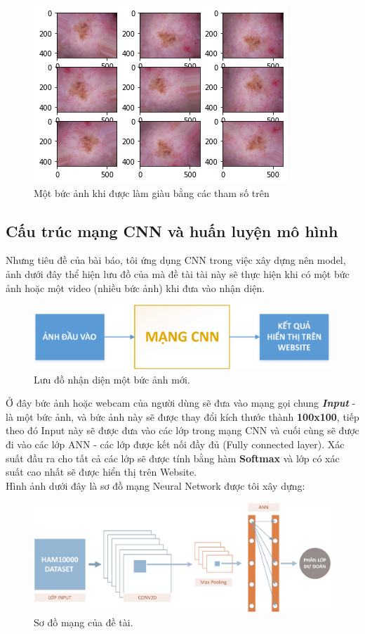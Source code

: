 \documentclass[12pt,a4paper]{article}
\begin{document}
	\begin{figure}[h!]
		\centering
		\includegraphics[width=0.5\linewidth]{./images/AnhLamGiau.png}
		\caption{Một bức ảnh khi được làm giàu bằng các tham số trên}
		\label{fig:AnhLamGiau}
	\end{figure}
	
	\subsection{Cấu trúc mạng CNN và huấn luyện mô hình}
	
	Nhưng tiêu đề của bài báo, tôi ứng dụng CNN trong việc xây dựng nên model, ảnh dưới đây thể hiện lưu đồ của mà đề tài tài này sẽ thực hiện khi có một bức ảnh hoặc một video (nhiều bức ảnh) khi đưa vào nhận diện.
	
	\begin{figure}[h!]
		\centering
		\includegraphics[width=0.8\linewidth]{./images/soDo_1.eps}
		\caption{Lưu đồ nhận diện một bức ảnh mới.}
		\label{fig:soDo1}
	\end{figure}

	\noindent
	Ở đây bức ảnh hoặc webcam của người dùng sẽ đưa vào mạng gọi chung \textit{\textbf{Input}} - là một bức ảnh, và bức ảnh này sẽ được thay đổi kích thước thành \textbf{100x100}, tiếp theo đó Input này sẽ được đưa vào các lớp trong mạng CNN và cuối cùng sẽ được đi vào các lớp ANN - các lớp được kết nối đầy đủ (Fully connected layer). Xác suất đầu ra cho tất cả các lớp sẽ được tính bằng hàm \textbf{Softmax} và lớp có xác suất cao nhất sẽ được hiển thị trên Website.\\
	
	\noindent
	Hình ảnh dưới đây là sơ đồ mạng Neural Network được tôi xây dựng:
	\begin{figure}[h!]
		\centering
		\includegraphics[width=0.8\linewidth]{./images/SoDoCNN.eps}
		\caption{Sơ đồ mạng của đề tài.}
		\label{fig:soDoMang}
	\end{figure}
	
\end{document}
